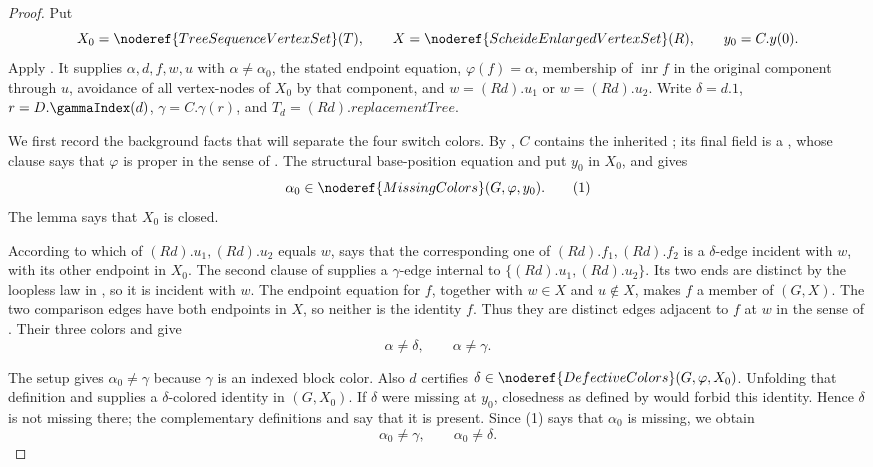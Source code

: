 \begin{proof}
Put
\[
 X_0=\noderef{TreeSequenceVertexSet}(T),\qquad
 X=\noderef{ScheideEnlargedVertexSet}(R),\qquad y_0=C.y(0).
\]
Apply .  It supplies
$\alpha,d,f,w,u$ with $\alpha\ne\alpha_0$, the stated endpoint equation,
$\varphi(f)=\alpha$, membership of $\operatorname{inr}f$ in the original
component through $u$, avoidance of all vertex-nodes of $X_0$ by that
component, and $w=(R d).u_1$ or $w=(R d).u_2$.  Write
$\delta=d.1$, $r=D.\gammaIndex(d)$, $\gamma=C.\gamma(r)$, and
$T_d=(R d).\mathit{replacementTree}$.

We first record the background facts that will separate the four switch
colors.  By , $C$ contains the
inherited ; its final field is a
, whose  clause says that
$\varphi$ is proper in the sense of .
The structural base-position equation and
 put $y_0$ in $X_0$, and
 gives
\[
 \alpha_0\in\noderef{MissingColors}(G,\varphi,y_0).          \tag{1}
\]
The lemma  says that $X_0$ is closed.

According to which of $(R d).u_1,(R d).u_2$ equals $w$,
 says that the corresponding one of
$(R d).f_1,(R d).f_2$ is a $\delta$-edge incident with $w$, with its other
endpoint in $X_0$.  The second clause of
 supplies a $\gamma$-edge
internal to $\{(R d).u_1,(R d).u_2\}$.  Its two ends are distinct by the
loopless law in , so it is incident with $w$.
The endpoint equation for $f$, together with $w\in X$ and $u\notin X$,
makes $f$ a member of $(G,X)$.  The two comparison
edges have both endpoints in $X$, so neither is the identity $f$.
Thus they are distinct edges adjacent to $f$ at $w$ in the sense of
.  Their three colors and
 give
\[
 \alpha\ne\delta,\qquad \alpha\ne\gamma.                  \tag{2}
\]

The setup gives $\alpha_0\ne\gamma$ because $\gamma$ is an indexed block
color.  Also $d$ certifies
$\delta\in\noderef{DefectiveColors}(G,\varphi,X_0)$.  Unfolding that
definition and  supplies a $\delta$-colored
identity in $(G,X_0)$.  If $\delta$ were missing at
$y_0$, closedness as defined by  would
forbid this identity.  Hence $\delta$ is not missing there; the
complementary definitions  and
 say that it is present.  Since (1) says that
$\alpha_0$ is missing, we obtain
\[
 \alpha_0\ne\gamma,\qquad \alpha_0\ne\delta.               \tag{3}
\]


\end{proof}
